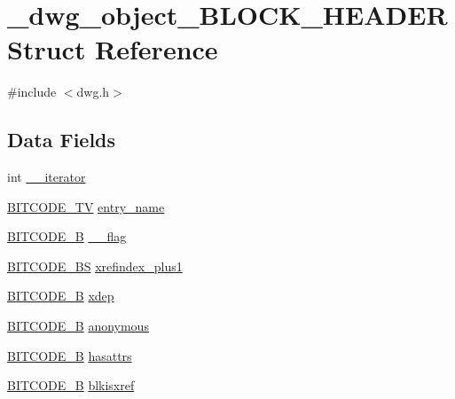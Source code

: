 \hypertarget{struct__dwg__object__BLOCK__HEADER}{\section{\-\_\-dwg\-\_\-object\-\_\-\-B\-L\-O\-C\-K\-\_\-\-H\-E\-A\-D\-E\-R \-Struct \-Reference}
\label{struct__dwg__object__BLOCK__HEADER}
}


{\ttfamily \#include $<$dwg.\-h$>$}

\subsection*{\-Data \-Fields}
\begin{DoxyCompactItemize}
\item 
int \hyperlink{struct__dwg__object__BLOCK__HEADER_a0a5e8eda00c342d985f34bbf095dc97b}{\-\_\-\-\_\-iterator}
\item 
\hyperlink{dwg_8h_a2a7e040c6e36ca039b03608679ecaf7c}{\-B\-I\-T\-C\-O\-D\-E\-\_\-\-T\-V} \hyperlink{struct__dwg__object__BLOCK__HEADER_aa9bb05f0bbe744c9bb9b93b56cb0487d}{entry\-\_\-name}
\item 
\hyperlink{dwg_8h_ab533b1f62d9086749e3bb5b67e9f224e}{\-B\-I\-T\-C\-O\-D\-E\-\_\-\-B} \hyperlink{struct__dwg__object__BLOCK__HEADER_a8820614828db48a61ffe255e6f3d77d7}{\-\_\-\_\-flag}
\item 
\hyperlink{dwg_8h_a94297606fbd4a4ff97e8add284af0809}{\-B\-I\-T\-C\-O\-D\-E\-\_\-\-B\-S} \hyperlink{struct__dwg__object__BLOCK__HEADER_a1cd55ace45d30be6ebbe934af0e6f296}{xrefindex\-\_\-plus1}
\item 
\hyperlink{dwg_8h_ab533b1f62d9086749e3bb5b67e9f224e}{\-B\-I\-T\-C\-O\-D\-E\-\_\-\-B} \hyperlink{struct__dwg__object__BLOCK__HEADER_a2d6dac46eadd343fc9ad664d14fad630}{xdep}
\item 
\hyperlink{dwg_8h_ab533b1f62d9086749e3bb5b67e9f224e}{\-B\-I\-T\-C\-O\-D\-E\-\_\-\-B} \hyperlink{struct__dwg__object__BLOCK__HEADER_a9baa93d7c82ba0ad2dfe411621a79789}{anonymous}
\item 
\hyperlink{dwg_8h_ab533b1f62d9086749e3bb5b67e9f224e}{\-B\-I\-T\-C\-O\-D\-E\-\_\-\-B} \hyperlink{struct__dwg__object__BLOCK__HEADER_a84c82a45f87291b502dada7a44d4af91}{hasattrs}
\item 
\hyperlink{dwg_8h_ab533b1f62d9086749e3bb5b67e9f224e}{\-B\-I\-T\-C\-O\-D\-E\-\_\-\-B} \hyperlink{struct__dwg__object__BLOCK__HEADER_a97d0f57d1f48c6c8518949a7e41a79d9}{blkisxref}

\end{DoxyCompactItemize}
